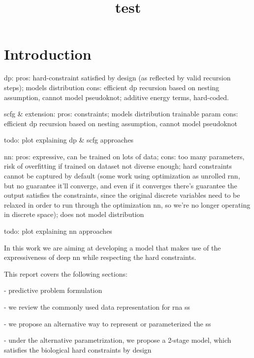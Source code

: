 \documentclass[12pt]{article}
\title{test}
\begin{document}
\maketitle



\section{Introduction}

dp:
pros: hard-constraint satisfied by design (as reflected by valid recursion steps);
models distribution
cons: efficient dp recursion based on nesting assumption, cannot model pseudoknot;
additive energy terms, hard-coded.

scfg & extension:
pros: constraints;
models distribution
trainable param
cons: efficient dp recursion based on nesting assumption, cannot model pseudoknot


todo: plot explaining dp & scfg approaches

nn:
pros: expressive, can be trained on lots of data;
cons: too many parameters, risk of overfitting if trained on dataset not diverse enough;
hard constraints cannot be captured by default
(some work using optimization as unrolled rnn, but no guarantee it'll converge,
and even if it converges there's guarantee the output satisfies the constraints,
since the original discrete variables need to be relaxed in order to run through the optimization nn,
so we're no longer operating in discrete space);
does not model distribution

todo: plot explaining nn approaches


In this work we are aiming at developing a model that makes use of the expressiveness of deep nn
while respecting the hard constraints.

This report covers the following sections:

- predictive problem formulation

- we review the commonly used data representation for rna ss

- we propose an alternative way to represent or parameterized the ss

- under the alternative parametrization, we propose a 2-stage model,
which satisfies the biological hard constraints by design
\end{document}
